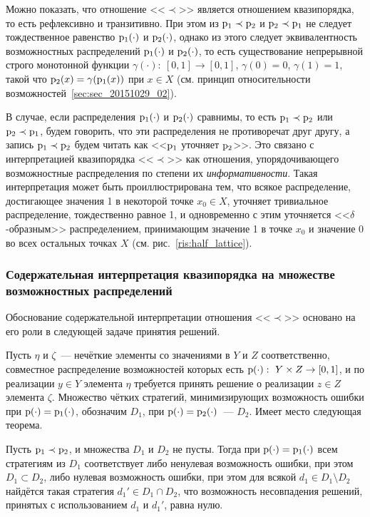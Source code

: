 Можно показать, что отношение <<$\prec$>> является отношением квазипорядка, то есть рефлексивно и транзитивно. При этом из ${\mathrm{p}}_1\prec{\mathrm{p}}_2$ и ${\mathrm{p}}_2\prec{\mathrm{p}}_1$ не следует тождественное равенство ${\mathrm{p}}_1(\cdot)$ и ${\mathrm{p}}_2(\cdot)$, однако из этого следует эквивалентность возможностных распределений ${\mathrm{p}}_1(\cdot)$ и ${\mathrm{p}}_2(\cdot)$, то есть существование непрерывной строго монотонной функции $\gamma (\cdot):\ [0,1]\to[0,1]$, $\gamma(0) = 0$, $\gamma(1) = 1$, такой что ${\mathrm{p}}_2(x) = \gamma({\mathrm{p}}_1(x))$ при $x\in X$ (см. принцип относительности возможностей~\ref{sec:sec_20151029_02}).

В случае, если распределения ${\mathrm{p}}_1(\cdot)$ и ${\mathrm{p}}_2(\cdot)$ сравнимы, то есть ${\mathrm{p}}_1\prec{\mathrm{p}}_2$ или ${\mathrm{p}}_2\prec{\mathrm{p}}_1$, будем говорить, что эти распределения не противоречат друг другу, а запись ${\mathrm{p}}_1\prec{\mathrm{p}}_2$ будем читать как <<${\mathrm{p}}_1$ уточняет ${\mathrm{p}}_2$>>. Это связано с интерпретацией квазипорядка <<$\prec$>> как отношения, упорядочивающего возможностные распределения по степени их \emph{информативности}. Такая интерпретация может быть проиллюстрирована тем, что всякое распределение, достигающее значения 1 в некоторой точке $x_0 \in X$, уточняет тривиальное распределение, тождественно равное 1, и одновременно с этим уточняется <<$\delta$-образным>> распределением, принимающим значение 1 в точке $x_0$ и значение 0 во всех остальных точках $X$ (см. рис.~\ref{ris:half_lattice}).

\subsubsection{Содержательная интерпретация квазипорядка на множестве возможностных распределений}

Обоснование содержательной интерпретации отношения <<$\prec$>> основано на его роли в следующей задаче принятия решений.

Пусть $\eta$ и $\zeta$~--- нечёткие элементы со значениями в $Y$ и $Z$ соответственно, совместное распределение возможностей которых есть ${\mathrm{p}}(\cdot):\ Y\times Z\to[0,1]$, и по реализации $y\in Y$ элемента $\eta$ требуется принять решение о реализации $z\in Z$ элемента $\zeta$. Множество чётких стратегий, минимизирующих возможность ошибки при ${\mathrm{p}}(\cdot) = {\mathrm{p}}_1(\cdot)$, обозначим $D_1$, при ${\mathrm{p}}(\cdot) = {\mathrm{p}}_2(\cdot)$~--- $D_2$.
Имеет место следующая теорема.

\begin{theorem}
\label{theorem_zubyuk}
    Пусть ${\mathrm{p}}_1\prec{\mathrm{p}}_2$, и множества $D_1$ и $D_2$ не пусты. Тогда при ${\mathrm{p}}(\cdot) = {\mathrm{p}}_1(\cdot)$ всем стратегиям из $D_1$ соответствует либо ненулевая возможность ошибки, при этом $D_1\subset D_2$, либо нулевая возможность ошибки, при этом для всякой $d_1\in D_1\setminus D_2$ найдётся такая стратегия $d_1'\in  D_1\cap D_2$, что возможность несовпадения решений, принятых с использованием $d_1$ и $d_1'$, равна нулю.
\end{theorem}

